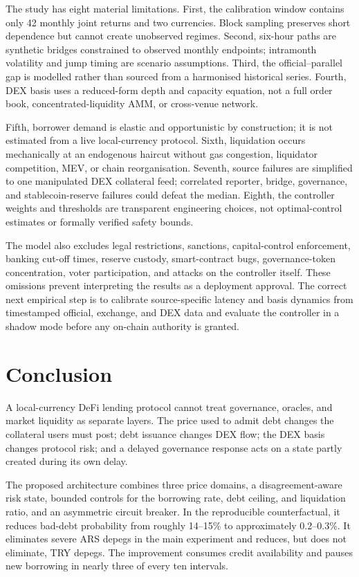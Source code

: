 \documentclass[sn-vancouver,Numbered]{sn-jnl}
\begin{document}
The study has eight material limitations. First, the calibration window contains only 42 monthly joint returns and two currencies. Block sampling preserves short dependence but cannot create unobserved regimes. Second, six-hour paths are synthetic bridges constrained to observed monthly endpoints; intramonth volatility and jump timing are scenario assumptions. Third, the official--parallel gap is modelled rather than sourced from a harmonised historical series. Fourth, DEX basis uses a reduced-form depth and capacity equation, not a full order book, concentrated-liquidity AMM, or cross-venue network.

Fifth, borrower demand is elastic and opportunistic by construction; it is not estimated from a live local-currency protocol. Sixth, liquidation occurs mechanically at an endogenous haircut without gas congestion, liquidator competition, MEV, or chain reorganisation. Seventh, source failures are simplified to one manipulated DEX collateral feed; correlated reporter, bridge, governance, and stablecoin-reserve failures could defeat the median. Eighth, the controller weights and thresholds are transparent engineering choices, not optimal-control estimates or formally verified safety bounds.

The model also excludes legal restrictions, sanctions, capital-control enforcement, banking cut-off times, reserve custody, smart-contract bugs, governance-token concentration, voter participation, and attacks on the controller itself. These omissions prevent interpreting the results as a deployment approval. The correct next empirical step is to calibrate source-specific latency and basis dynamics from timestamped official, exchange, and DEX data and evaluate the controller in a shadow mode before any on-chain authority is granted.

\section{Conclusion}\label{sec:conclusion}

A local-currency DeFi lending protocol cannot treat governance, oracles, and market liquidity as separate layers. The price used to admit debt changes the collateral users must post; debt issuance changes DEX flow; the DEX basis changes protocol risk; and a delayed governance response acts on a state partly created during its own delay.

The proposed architecture combines three price domains, a disagreement-aware risk state, bounded controls for the borrowing rate, debt ceiling, and liquidation ratio, and an asymmetric circuit breaker. In the reproducible counterfactual, it reduces bad-debt probability from roughly 14--15\% to approximately 0.2--0.3\%. It eliminates severe ARS depegs in the main experiment and reduces, but does not eliminate, TRY depegs. The improvement consumes credit availability and pauses new borrowing in nearly three of every ten intervals.
\end{document}
